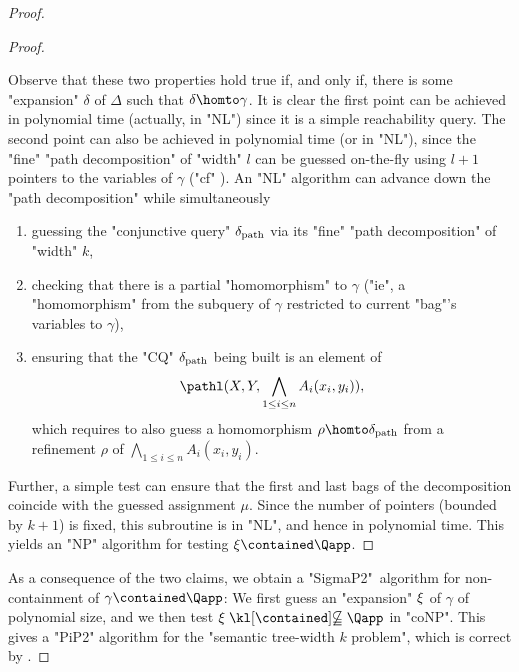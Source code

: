 \begin{proof}
\begin{proof}
\begin{enumerate}
        \end{enumerate}
        Observe that  these two properties hold true if, and only if, there is some "expansion" $\delta$ of $\Delta$ such that $\delta \homto \gamma$.
        It is clear the first point can be achieved in polynomial time (actually, in "NL") since it is a simple reachability query. 
        The second point can also be achieved in polynomial time (or in "NL"), since the "fine" "path decomposition" of "width" $l$ can be guessed on-the-fly using $l+1$ pointers to the variables of $\gamma$ ("cf" ). An "NL" algorithm can advance down the "path decomposition" while simultaneously
        \begin{enumerate}
          \item guessing the "conjunctive query" $\delta_{\textup{path}}$ via its "fine" "path decomposition" of "width" $k$,
          \item checking that there is a partial "homomorphism" to $\gamma$ ("ie", a "homomorphism" from the subquery of $\gamma$ restricted to current "bag"'s variables to $\gamma$),
          \item ensuring that the "CQ" $\delta_{\textup{path}}$ being built is an element of
		  \[\pathl(X, Y, \bigwedge_{1 \leq i \leq n} A_i(x_i,y_i)),\] which requires to also guess a homomorphism $\rho \homto \delta_{\textup{path}}$ from a refinement $\rho$ of $\bigwedge_{1 \leq i \leq n} A_i(x_i,y_i)$.
        \end{enumerate}
        Further, a simple test can ensure that the first and last bags of the decomposition  coincide with the guessed assignment $\mu$.
        Since the number of pointers (bounded by $k+1$) is fixed, this subroutine is in "NL", and hence in polynomial time. This yields an "NP" algorithm for testing $\xi \contained \Qapp$.
  \end{proof}


  As a consequence of the two claims, we obtain a "SigmaP2"~algorithm for non-containment of $\gamma \contained \Qapp$: We first guess an "expansion" $\xi$ of $\gamma$ of polynomial size, and we then test $\anexpansion \notcontained \Qapp$ in "coNP". This gives a {"PiP2"} algorithm for the "semantic tree-width $k$ problem", which is correct by
  .
\end{proof}